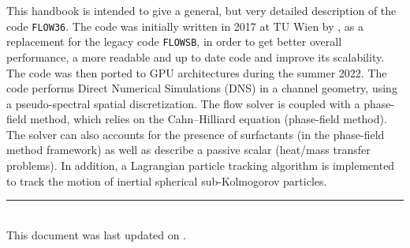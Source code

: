 This handbook is intended to give a general, but very detailed description of the code \texttt{FLOW36}.
The code was initially written in 2017 at TU Wien by \@author, as a replacement for the legacy code \texttt{FLOWSB}, in order to get better overall performance, a more readable and up to date code and improve its scalability.
The code was then ported to GPU architectures during the summer 2022.
The code performs Direct Numerical Simulations (DNS) in a channel geometry, using a pseudo-spectral spatial discretization. 
The flow solver is coupled with a phase-field method, which relies on the Cahn--Hilliard equation (phase-field method).
The solver can also accounts for the presence of surfactants (in the phase-field method framework) as well as describe a passive scalar (heat/mass transfer problems).
In addition, a Lagrangian particle tracking algorithm is implemented to track the motion of inertial spherical sub-Kolmogorov particles.


\vfill
\rule{14cm}{0.4pt}\\

This document was last updated on \@date.